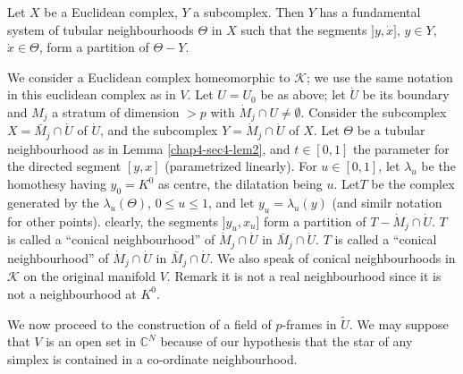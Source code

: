 \setcounter{lemma}{1}                 
\begin{lemma}\label{chap4-sec4-lem2} %
Let $X$ be a Euclidean complex, $Y$ a subcomplex. Then $Y$ has a
fundamental system of tubular neighbourhoods $\Theta$ in $X$ such that
the segments $]y,\dot{x}]$, $y\in Y$, $\dot{x}\in\Theta$, form a
    partition of $\Theta-Y$.
 \end{lemma}
 
We consider a Euclidean complex homeomorphic to $\mathscr{K}$; we use
the same notation in this euclidean complex as in $V$. Let $U=U_{0}$
be as above; let $\dot{U}$ be its boundary and $M_{j}$ a stratum of
dimension $>p$ with $\dot{M}_{j}\cap U\neq \emptyset$. Consider the
subcomplex $X=\bar{M}_{j}\cap \dot{U}$ of $\dot{U}$, and the
subcomplex $Y=\dot{M}_{j}\cap \dot{U}$ of $X$. Let $\Theta$ be a
tubular neighbourhood as in Lemma \ref{chap4-sec4-lem2}, and $t\in [0,1]$
the parameter for the directed segment $[y,x]$ (parametrized
linearly). For $u\in[0,1]$, let $\lambda_{u}$ be the homothesy having
$y_{0}=K^{0}$ as centre, the dilatation being $u$. 
Let\pageoriginale $T$ be the complex generated by the
$\lambda_{u}(\Theta)$, $0\leq u\leq 1$, and let $y_{u}=\lambda_{u}(y)$
(and similr notation for other points). clearly, the segments
$]y_{u},x_{u}]$ form a partition of $T-\dot{M}_{j}\cap \dot{U}$. $T$
    is called a ``conical neighbourhood'' of $\dot{M}_{j}\cap \dot{U}$
    in $\bar{M}_{j}\cap \dot{U}$. $T$ is called a ``conical
    neighbourhood'' of $\dot{M}_{j}\cap \dot{U}$ in $\bar{M}_{j}\cap
    \dot{U}$. We also speak of conical neighbourhoods in $\mathscr{K}$
    on the original manifold $V$. Remark it is not a real
    neighbourhood since it is not a neighbourhood at $K^{0}$.

We now proceed to the construction of a field of $p$-frames in
$\widetilde{U}$. We may suppose that $V$ is an open set in
$\mathbb{C}^{N}$ because of our hypothesis that the star of any
simplex is contained in a co-ordinate neighbourhood.

